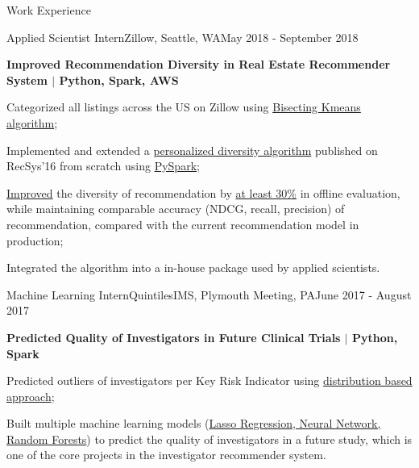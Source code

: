 \documentclass{my_resume} %
\begin{document}
\begin{rSection}{Work Experience}

  \begin{rSubsection}{Applied Scientist Intern}{Zillow, Seattle,
    WA}{May 2018 - September 2018}

  \item[] \textbf{Improved Recommendation Diversity in Real Estate Recommender
      System
    $|$ Python, Spark, AWS}
  \item Categorized all listings across the US on Zillow using  
    \underline{Bisecting Kmeans algorithm};
  \item Implemented and extended a \underline{personalized diversity algorithm}
    published on RecSys'16 from scratch using \underline{PySpark};
  \item \underline{Improved} the diversity of recommendation by \underline{at
    least 30\%} in offline evaluation, while maintaining comparable accuracy
    (NDCG, recall, precision) of recommendation, compared with the current
    recommendation model in production;
  \item Integrated the algorithm into a in-house package used by applied
    scientists.
  \end{rSubsection}

  \begin{rSubsection}{Machine Learning Intern}{QuintilesIMS, Plymouth Meeting,
    PA}{June 2017 - August 2017}

  \item[] \textbf{Predicted Quality of Investigators in Future Clinical Trials
    $|$ Python, Spark}
  \item Predicted outliers of investigators per Key Risk Indicator using
    \underline{distribution based approach};
  \item Built multiple machine learning models (\underline{Lasso Regression, Neural
    Network, Random Forests}) to predict the quality of investigators in a
    future study, which is one of the core projects in the investigator
    recommender system.
  \end{rSubsection}


\end{rSection}
\end{document}
